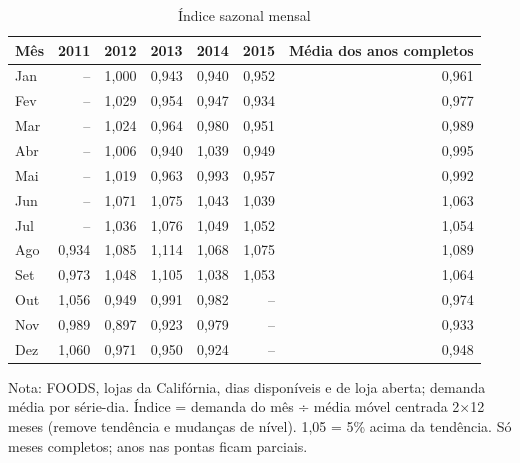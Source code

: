 \begin{table}[htbp]
\centering
\small
\caption{Índice sazonal mensal}
\label{tab:saz_indice_mensal}
\begin{tabular}{lrrrrrr}
\toprule
Mês & 2011 & 2012 & 2013 & 2014 & 2015 & Média dos anos completos \\
\midrule
Jan & -- & 1,000 & 0,943 & 0,940 & 0,952 & 0,961 \\
Fev & -- & 1,029 & 0,954 & 0,947 & 0,934 & 0,977 \\
Mar & -- & 1,024 & 0,964 & 0,980 & 0,951 & 0,989 \\
Abr & -- & 1,006 & 0,940 & 1,039 & 0,949 & 0,995 \\
Mai & -- & 1,019 & 0,963 & 0,993 & 0,957 & 0,992 \\
Jun & -- & 1,071 & 1,075 & 1,043 & 1,039 & 1,063 \\
Jul & -- & 1,036 & 1,076 & 1,049 & 1,052 & 1,054 \\
Ago & 0,934 & 1,085 & 1,114 & 1,068 & 1,075 & 1,089 \\
Set & 0,973 & 1,048 & 1,105 & 1,038 & 1,053 & 1,064 \\
Out & 1,056 & 0,949 & 0,991 & 0,982 & -- & 0,974 \\
Nov & 0,989 & 0,897 & 0,923 & 0,979 & -- & 0,933 \\
Dez & 1,060 & 0,971 & 0,950 & 0,924 & -- & 0,948 \\
\bottomrule
\end{tabular}
\par\smallskip
{\footnotesize Nota: FOODS, lojas da Califórnia, dias disponíveis e de loja aberta; demanda média por série-dia. Índice = demanda do mês ÷ média móvel centrada 2×12 meses (remove tendência e mudanças de nível). 1,05 = 5\% acima da tendência. Só meses completos; anos nas pontas ficam parciais.}
\end{table}
